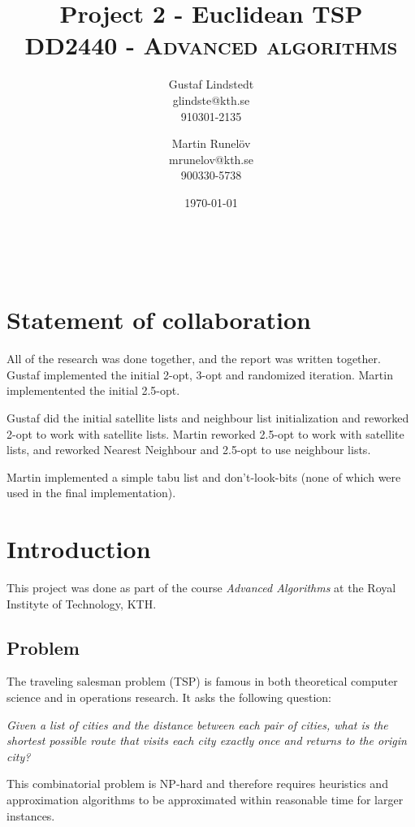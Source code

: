 \documentclass[paper=a4, fontsize=11pt,numbers=endperiod]{scrartcl} %
\title{ 
\huge Project 2 - Euclidean TSP \\ %
\vspace{10pt}
\normalfont \normalsize 
\textsc{DD2440 - Advanced algorithms } \\ [25pt] %
}
\author{Gustaf Lindstedt \\ glindste@kth.se \\ 910301-2135 \and Martin Runelöv \\ mrunelov@kth.se \\ 900330-5738}
\date{\vspace{8pt}\normalsize\today} %
\numberwithin{equation}{section} %
\numberwithin{figure}{section} %
\numberwithin{table}{section} %
\begin{document}
\maketitle %


\hspace{0pt}\\
\section*{Statement of collaboration}
All of the research was done together, and the report was written together.
Gustaf implemented the initial 2-opt, 3-opt and randomized iteration.
Martin implementented the initial 2.5-opt.

Gustaf did the initial satellite lists and neighbour list initialization and reworked 2-opt to work with satellite lists.
Martin reworked 2.5-opt to work with satellite lists, and reworked Nearest Neighbour and 2.5-opt to use neighbour lists.

Martin implemented a simple tabu list and don't-look-bits (none of which were used in the final implementation).



\section{Introduction}

This project was done as part of the course \emph{Advanced Algorithms} at the Royal Instityte of Technology, KTH.

\subsection{Problem}

The traveling salesman problem (TSP) is famous in both theoretical computer science and in operations research. It asks the following question: 

\begin{center}
    \emph{Given a list of cities and the distance between each pair of cities, what is the shortest possible route that visits each city exactly once and returns to the origin city?}
\end{center}

This combinatorial problem is NP-hard and therefore requires heuristics and approximation algorithms to be approximated within reasonable time for larger instances.
\end{document}
